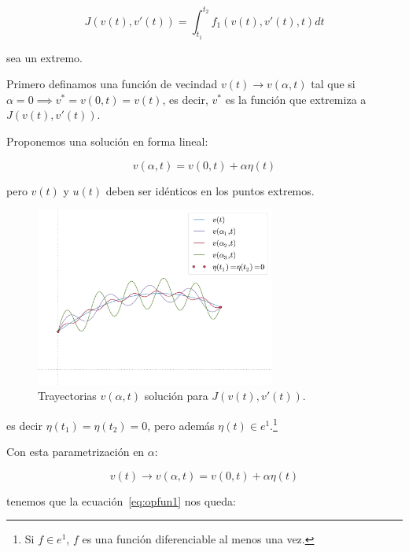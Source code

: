         \begin{equation} \label{eq:opfun1}
            J(v(t), v'(t)) = \int_{t_1}^{t_2} f_1(v(t), v'(t), t) dt
        \end{equation}

        sea un extremo.

        Primero definamos una función de vecindad $v(t) \to v(\alpha, t)$ tal que si $\alpha = 0 \implies v^* = v(0, t) = v(t)$, es decir, $v^*$ es la función que extremiza a $J(v(t), v'(t))$.

        Proponemos una solución en forma lineal:

        \begin{equation}
            v(\alpha, t) = v(0, t) + \alpha \eta(t)
        \end{equation}

        pero $v(t)$ y $u(t)$ deben ser idénticos en los puntos extremos.

        \begin{figure}
            \centering
            \includegraphics[width=0.7\textwidth]{./imagenes/trayectorias.pdf}
            \caption{\label{fig:trayectorias}Trayectorias $v(\alpha, t)$ solución para $J(v(t), v'(t))$.}
        \end{figure}

        es decir $\eta(t_1) = \eta(t_2) = 0$, pero además $\eta(t) \in e^1$.\footnote{Si $f \in e^1$, $f$ es una función diferenciable al menos una vez.}

        Con esta parametrización en $\alpha$:

        \begin{equation*}
            v(t) \to v(\alpha, t) = v(0, t) + \alpha \eta(t)
        \end{equation*}

        tenemos que la ecuación~\ref{eq:opfun1} nos queda:

